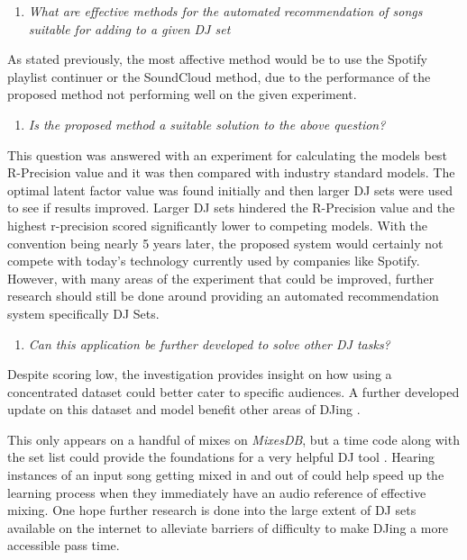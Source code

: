 \begin{enumerate}
	\item \textit{What are effective methods for the automated recommendation of songs suitable
		for adding to a given DJ set}
\end{enumerate}

As stated previously, the most affective method would be to use the Spotify playlist continuer or the SoundCloud method, due to the performance of the proposed method not performing well on the given experiment. 

\begin{enumerate}
	\item \textit{Is the proposed method a suitable solution to the above question?}
\end{enumerate}

This question was answered with an experiment for calculating the models best R-Precision value and it was then compared with industry standard models. The optimal latent factor value was found initially and then larger DJ sets were used to see if results improved. Larger DJ sets hindered the R-Precision value and the highest r-precision scored significantly lower to competing models. With the convention being nearly 5 years later, the proposed system would certainly not compete with today's technology currently used by companies like Spotify. However, with many areas of the experiment that could be improved, further research should still be done  around providing an automated recommendation system specifically DJ Sets.

\begin{enumerate}
	\item \textit{Can this application be further developed to solve other DJ tasks?}
\end{enumerate}

Despite scoring low, the investigation provides insight on how using a concentrated dataset could better cater to specific audiences. A further developed update on this dataset and model benefit other areas of DJing . 

This only appears on a handful of mixes on \textit{MixesDB}, but a time code along with the set list could provide the foundations for a very helpful DJ tool \citep{mixesdb_2015-01-02_2015}. Hearing instances of an input song getting mixed in and out of could help speed up the learning process when they immediately have an audio reference of effective mixing. One hope further research is done into the large extent of DJ sets available on the internet to alleviate barriers of difficulty to make DJing a more accessible pass time. 

